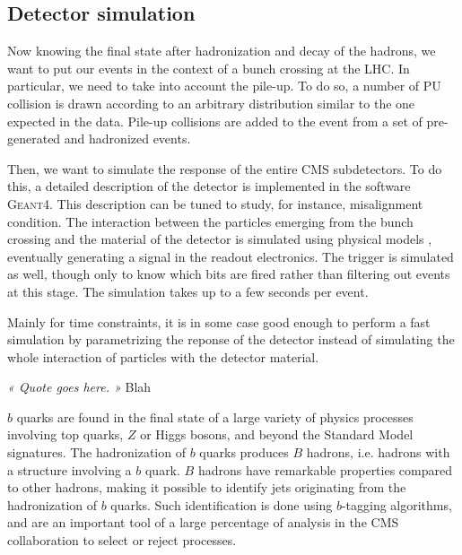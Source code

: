             \subsection{Detector simulation}

            Now knowing the final state after hadronization and decay of the hadrons, we
            want to put our events in the context of a bunch crossing at the LHC. In
            particular, we need to take into account the pile-up. To do so, a number of
            PU collision is drawn according to an arbitrary distribution similar to the
            one expected in the data. Pile-up collisions are added to the event from a
            set of pre-generated and hadronized events.

            Then, we want to simulate the response of the entire CMS subdetectors. To do
            this, a detailed description of the detector is implemented in the software
            \textsc{Geant4}. This description can be tuned to study, for instance,
            misalignment condition. The interaction between the particles emerging from
            the bunch crossing and the material of the detector is simulated using physical
            models , eventually generating a signal in
            the readout electronics. The trigger is simulated as well, though only to know
            which bits are fired rather than filtering out events at this stage. The
            simulation takes up to a few seconds per event.

            Mainly for time constraints, it is in some case good enough to perform a
            fast simulation by parametrizing the reponse of the detector instead of
            simulating the whole interaction of particles with the detector material.

\setcounter{mtc}{5}
\hspace*{0.66\textwidth}
\begin{minipage}{0.33\textwidth}
\emph{« Quote goes here. »}
\hspace*{0.6\textwidth} Blah
\end{minipage}
\minitoc
\newpage

    $b$ quarks are found in the final state of a large variety of physics processes
    involving top quarks, $Z$ or Higgs bosons, and beyond the Standard Model signatures.
    The hadronization of $b$ quarks produces $B$ hadrons, i.e. hadrons with a structure
    involving a $b$ quark. $B$ hadrons have remarkable properties compared to other hadrons,
    making it possible to identify jets originating from the hadronization of $b$ quarks.
    Such identification is done using $b$-tagging algorithms, and are an important tool of
    a large percentage of analysis in the CMS collaboration to select or reject processes.


